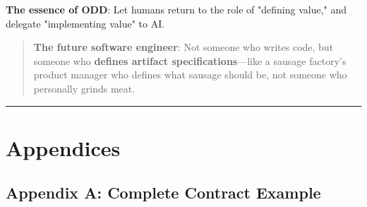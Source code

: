 \documentclass[
]{article}
\begin{document}
\textbf{The essence of ODD}: Let humans return to the role of "defining
value," and delegate "implementing value" to AI.

\begin{quote}
\textbf{The future software engineer}: Not someone who writes code, but
someone who \textbf{defines artifact specifications}---like a sausage
factory's product manager who defines what sausage should be, not
someone who personally grinds meat.
\end{quote}

\begin{center}\rule{0.5\linewidth}{0.5pt}\end{center}

\hypertarget{appendices}{%
\section{Appendices}\label{appendices}}

\hypertarget{appendix-a-complete-contract-example}{%
\subsection{Appendix A: Complete Contract
Example}\label{appendix-a-complete-contract-example}}
\end{document}
